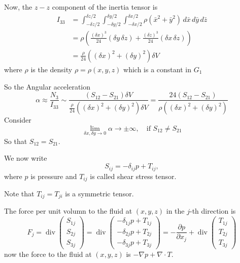 Now, the $z-z$ component of the inertia tensor is
\begin{equation}
\begin{aligned}
I_{33}
&= \int_{-\delta z/2}^{\delta z/2}\int_{-\delta y/2}^{\delta y/2}\int_{-\delta x/2}^{\delta x/2} \rho\left(\bar{x}^2+\bar{y}^2\right)\,d\bar{x}\,d\bar{y}\,d\bar{z}\\
&= \rho \left(\frac{(\delta x)^3}{24}\left(\delta y\,\delta z\right) + \frac{(\delta z)^3}{24}\left(\delta x\,\delta z\right)\right)\\
&= \frac{\rho}{24}\left((\delta x)^2 + (\delta y)^2\right) \delta V
\end{aligned}
\end{equation}
where $\rho$ is the density $\rho = \rho(x,y,z)$ which is a constant in $G_1$

So the Angular acceleration
\begin{equation}
\alpha \approx \frac{N_3}{I_{33}} \sim \frac{(S_{12}-S_{21})\delta V}{\frac{\rho}{24}\left((\delta x)^2 + (\delta y)^2\right) \delta V} = \frac{24(S_{12} - S_{21})}{\rho \left((\delta x)^2 + (\delta y)^2\right)}
\end{equation}
Consider 
\begin{equation}
\lim_{\delta x,\delta y\to 0} \alpha \to \pm \infty,\quad\text{if $S_{12}\neq S_{21}$}
\end{equation}
So that $S_{12} = S_{21}$.

We now write
\begin{equation}
S_{ij} = -\delta_{ij} p + T_{ij},
\end{equation}
where $p$ is pressure and $T_{ij}$ is called shear stress tensor.

Note that $T_{ij} = T_{ji}$ is a symmetric tensor.

The force per unit volumn to the fluid at $(x,y,z)$ in the $j$-th direction is 
\begin{equation}
F_{j} = \operatorname{div}\begin{pmatrix}S_{1j}\\S_{2j}\\S_{3j}\end{pmatrix}
= \operatorname{div}\begin{pmatrix}
-\delta_{1j} p + T_{1j}\\
-\delta_{2j} p + T_{2j}\\
-\delta_{3j} p + T_{3j}
\end{pmatrix} = -\frac{\partial p}{\partial x_{j}} + \operatorname{div}\begin{pmatrix}T_{1j}\\T_{2j}\\T_{3j}\end{pmatrix}
\end{equation}
now the force to the fluid at $(x,y,z)$ is $-\nabla p + \nabla \cdot T$.

